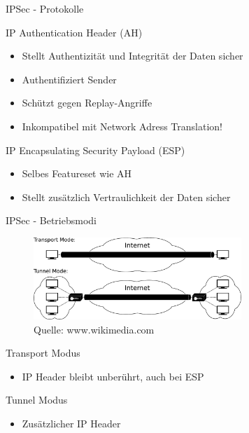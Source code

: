 \documentclass{beamer}
\begin{document}
\begin{frame}{IPSec - Protokolle}
 \begin{block}{IP Authentication Header (AH)}
  \begin{itemize}
   \item Stellt Authentizität und Integrität der Daten sicher
   \item Authentifiziert Sender 
   \item Schützt gegen Replay-Angriffe
   \item Inkompatibel mit Network Adress Translation!
  \end{itemize}
 \end{block}
 \begin{block}{IP Encapsulating Security Payload (ESP)}
  \begin{itemize}
   \item Selbes Featureset wie AH
   \item Stellt zusätzlich Vertraulichkeit der Daten sicher
  \end{itemize}
 \end{block}
\end{frame}


\begin{frame}{IPSec - Betriebsmodi}
  \begin{figure}
    \includegraphics[width=0.7\textwidth]{pics/modes}
    \caption{Quelle: www.wikimedia.com}
  \end{figure} 
  {
    \begin{block}{Transport Modus}
      \begin{itemize}
	\item IP Header bleibt unberührt, auch bei ESP
      \end{itemize}
    \end{block} 
  }
  {
    \begin{block}{Tunnel Modus}
      \begin{itemize}
	\item Zusätzlicher IP Header 
      \end{itemize}
    \end{block} 
  }
\end{frame}
\end{document}
